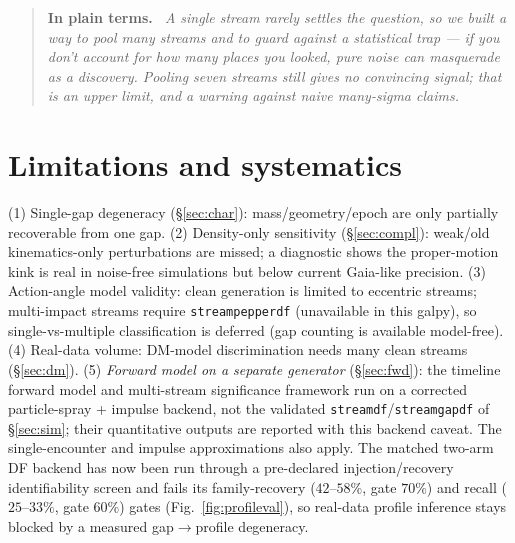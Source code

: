 \documentclass[fleqn,usenatbib]{mnras}
\newcommand{\code}[1]{\texttt{#1}}
\newenvironment{plainterms}%
  {\par\medskip\begin{quotation}\noindent\small\textbf{In plain terms.}\itshape\ }%
  {\end{quotation}\medskip}
\begin{document}
\begin{plainterms}
A single stream rarely settles the question, so we built a way to pool many streams and
to guard against a statistical trap --- if you don't account for how many places you
looked, pure noise can masquerade as a discovery. Pooling seven streams still gives no
convincing signal; that is an upper limit, and a warning against naive many-sigma claims.
\end{plainterms}

\section{Limitations and systematics}
\label{sec:lim}
(1) Single-gap degeneracy (\S\ref{sec:char}): mass/geometry/epoch are only partially
recoverable from one gap. (2) Density-only sensitivity (\S\ref{sec:compl}): weak/old
kinematics-only perturbations are missed; a diagnostic shows the proper-motion kink is
real in noise-free simulations but below current Gaia-like precision.
(3) Action-angle model validity: clean generation is limited to eccentric streams;
multi-impact streams require \code{streampepperdf} (unavailable in this galpy), so
single-vs-multiple classification is deferred (gap counting is available model-free).
(4) Real-data volume: DM-model discrimination needs many clean streams
(\S\ref{sec:dm}). (5) \emph{Forward model on a separate generator} (\S\ref{sec:fwd}):
the timeline forward model and multi-stream significance framework run on a corrected
particle-spray + impulse backend, not the validated \code{streamdf}/\code{streamgapdf}
of \S\ref{sec:sim}; their quantitative outputs are reported with this backend caveat.
The single-encounter and impulse approximations also apply. The matched two-arm DF
backend has now been run through a pre-declared injection/recovery identifiability screen
and fails its family-recovery ($42$--$58\%$, gate $70\%$) and recall ($25$--$33\%$, gate
$60\%$) gates (Fig.~\ref{fig:profileval}), so real-data profile inference stays blocked by
a measured gap$\rightarrow$profile degeneracy.
\end{document}
